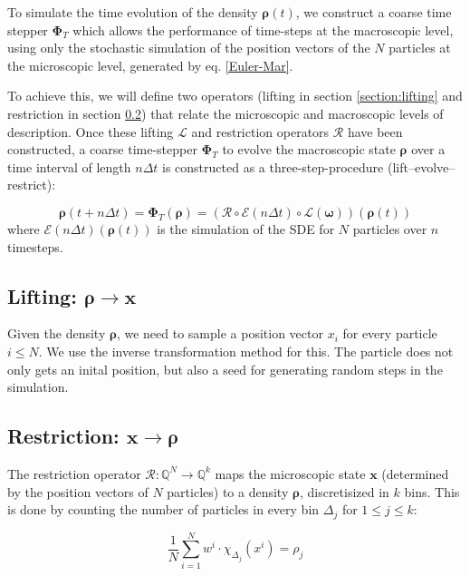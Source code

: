 \documentclass[]{article}
\newcommand{\U}{\ensuremath{\boldsymbol{\rho}}}
\newcommand{\cts}{\ensuremath{\boldsymbol{\Phi}_T}} %
\begin{document}
To simulate the time evolution of  the density $\U(t)$, we construct  a coarse time stepper $\cts$ which allows the performance of time-steps at the macroscopic level, using only the stochastic simulation of the position vectors of the $N$ particles at the microscopic level, %
generated by eq. \eqref{Euler-Mar}. 

To achieve this, we will define two operators (lifting in section \ref{section:lifting} and
restriction in section \ref{section:restriction}) that relate the microscopic and macroscopic levels of description.
Once these lifting $\mathcal{L}$ and restriction  operators $\mathcal{R}$ have been constructed, a coarse time-stepper $\cts$ 
to evolve the macroscopic state $\U$ over a time interval of length $n \Delta t$ is constructed as a three-step-procedure (lift–evolve–restrict):

\begin{equation}
\U(t + n \Delta t) = \cts(\U) = (\mathcal{R} \circ \mathcal{E}(n \Delta t) \circ  \mathcal{L}(\mathbf{\omega})  ) (\U(t))
\end{equation}
where $\mathcal{E}(n \Delta t)(\U(t))$ is the simulation of the SDE for $N$ particles over $n$ timesteps.


\subsection{Lifting: $\U \rightarrow \mathbf{x} $}
Given the density \U, we need to sample a position vector $x_i$ for every particle $i \leq N$. We use the inverse transformation method for this. \label{section:lifting}
The particle does not only gets an inital position, but also a seed for generating random steps in the simulation.

\subsection{Restriction:  $\mathbf{x} \rightarrow \U $}
\label{section:restriction}
The restriction operator $\mathcal{R}: \mathbb{Q}^N \rightarrow \mathbb{Q}^k$ maps the microscopic state $\mathbf{x}$ (determined by the position vectors of $N$ particles) to a density \U, discretisized in $k$ bins. This is done by counting the number of particles in every bin $\Delta_j$ for $1\leq j \leq k$: %

\begin{equation}
\frac{1}{N} \sum_{i=1}^{N}  w^i \cdot \chi_{\Delta_j}(x^i) = \rho_j  \label{restriction}
\end{equation}
\end{document}
